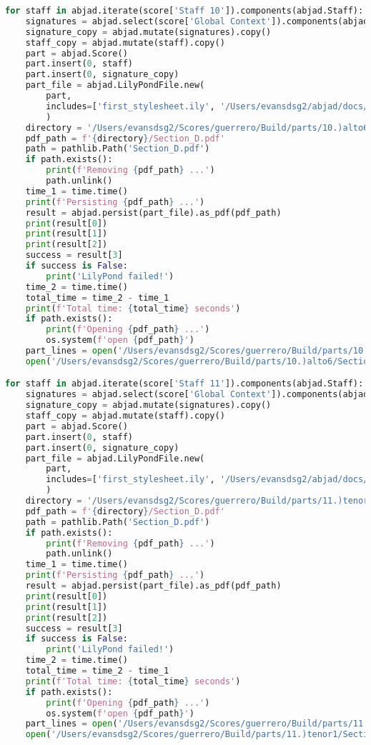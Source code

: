 \begin{lstlisting}[language=Python, caption=Invocation Source Code]
for staff in abjad.iterate(score['Staff 10']).components(abjad.Staff):
    signatures = abjad.select(score['Global Context']).components(abjad.Staff)
    signature_copy = abjad.mutate(signatures).copy()
    staff_copy = abjad.mutate(staff).copy()
    part = abjad.Score()
    part.insert(0, staff)
    part.insert(0, signature_copy)
    part_file = abjad.LilyPondFile.new(
        part,
        includes=['first_stylesheet.ily', '/Users/evansdsg2/abjad/docs/source/_stylesheets/abjad.ily'],
        )
    directory = '/Users/evansdsg2/Scores/guerrero/Build/parts/10.)alto6'
    pdf_path = f'{directory}/Section_D.pdf'
    path = pathlib.Path('Section_D.pdf')
    if path.exists():
        print(f'Removing {pdf_path} ...')
        path.unlink()
    time_1 = time.time()
    print(f'Persisting {pdf_path} ...')
    result = abjad.persist(part_file).as_pdf(pdf_path)
    print(result[0])
    print(result[1])
    print(result[2])
    success = result[3]
    if success is False:
        print('LilyPond failed!')
    time_2 = time.time()
    total_time = time_2 - time_1
    print(f'Total time: {total_time} seconds')
    if path.exists():
        print(f'Opening {pdf_path} ...')
        os.system(f'open {pdf_path}')
    part_lines = open('/Users/evansdsg2/Scores/guerrero/Build/parts/10.)alto6/Section_D.ly').readlines()
    open('/Users/evansdsg2/Scores/guerrero/Build/parts/10.)alto6/Section_D.ly', 'w').writelines(part_lines[15:-1])

for staff in abjad.iterate(score['Staff 11']).components(abjad.Staff):
    signatures = abjad.select(score['Global Context']).components(abjad.Staff)
    signature_copy = abjad.mutate(signatures).copy()
    staff_copy = abjad.mutate(staff).copy()
    part = abjad.Score()
    part.insert(0, staff)
    part.insert(0, signature_copy)
    part_file = abjad.LilyPondFile.new(
        part,
        includes=['first_stylesheet.ily', '/Users/evansdsg2/abjad/docs/source/_stylesheets/abjad.ily'],
        )
    directory = '/Users/evansdsg2/Scores/guerrero/Build/parts/11.)tenor1'
    pdf_path = f'{directory}/Section_D.pdf'
    path = pathlib.Path('Section_D.pdf')
    if path.exists():
        print(f'Removing {pdf_path} ...')
        path.unlink()
    time_1 = time.time()
    print(f'Persisting {pdf_path} ...')
    result = abjad.persist(part_file).as_pdf(pdf_path)
    print(result[0])
    print(result[1])
    print(result[2])
    success = result[3]
    if success is False:
        print('LilyPond failed!')
    time_2 = time.time()
    total_time = time_2 - time_1
    print(f'Total time: {total_time} seconds')
    if path.exists():
        print(f'Opening {pdf_path} ...')
        os.system(f'open {pdf_path}')
    part_lines = open('/Users/evansdsg2/Scores/guerrero/Build/parts/11.)tenor1/Section_D.ly').readlines()
    open('/Users/evansdsg2/Scores/guerrero/Build/parts/11.)tenor1/Section_D.ly', 'w').writelines(part_lines[15:-1])


\end{lstlisting}
